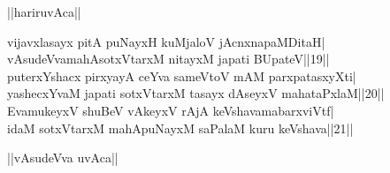 \documentclass{article}
\begin{document}
\begin{center}
||hariruvAca||
\end{center}

vijavxlasayx pitA puNayxH kuMjaloV jAcnxnapaMDitaH|\\
vAsudeVvamahAsotxVtarxM nitayxM japati BUpateV||19||\\
puterxYshacx pirxyayA ceYva sameVtoV mAM parxpatasxyXti|\\
yashecxYvaM japati sotxVtarxM tasayx dAseyxV mahataPxlaM||20||\\
EvamukeyxV shuBeV vAkeyxV rAjA keVshavamabarxviVtf|\\
idaM sotxVtarxM mahApuNayxM saPalaM kuru keVshava||21||\\

\begin{center}
||vAsudeVva uvAca||
\end{center}
\end{document}
